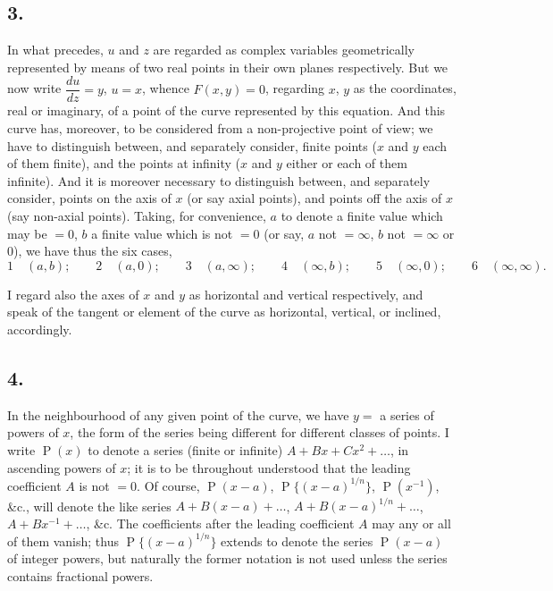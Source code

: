 \documentclass[11pt,a4paper]{article}
\theoremstyle{definition}
\DeclareMathOperator{\Pf}{P}
\begin{document}
\subsection*{3.}

In what precedes, $u$ and $z$ are regarded as complex variables geometrically represented by means of two real points in their own planes respectively. But we now write $\dfrac{du}{dz} = y$, $u = x$, whence $F(x, y) = 0$, regarding $x$, $y$ as the coordinates, real or imaginary, of a point of the curve represented by this equation. And this curve has, moreover, to be considered from a non-projective point of view; we have to distinguish between, and separately consider, finite points ($x$ and $y$ each of them finite), and the points at infinity ($x$ and $y$ either or each of them infinite). And it is moreover necessary to distinguish between, and separately consider, points on the axis of $x$ (or say axial points), and points off the axis of $x$ (say non-axial points). Taking, for convenience, $a$ to denote a finite value which may be $= 0$, $b$ a finite value which is not $= 0$ (or say, $a$ not $= \infty$, $b$ not $= \infty$ or $0$), we have thus the six cases,
\[
1\quad (a, b); \qquad 2\quad (a, 0); \qquad 3\quad (a, \infty); \qquad 4\quad (\infty, b); \qquad 5\quad (\infty, 0); \qquad 6\quad (\infty, \infty).
\]

I regard also the axes of $x$ and $y$ as horizontal and vertical respectively, and speak of the tangent or element of the curve as horizontal, vertical, or inclined, accordingly.

\subsection*{4.}

In the neighbourhood of any given point of the curve, we have $y =$ a series of powers of $x$, the form of the series being different for different classes of points. I write $\Pf(x)$ to denote a series (finite or infinite) $A + Bx + Cx^2 + \ldots$, in ascending powers of $x$; it is to be throughout understood that the leading coefficient $A$ is not $= 0$. Of course, $\Pf(x-a)$, $\Pf\{(x-a)^{1/n}\}$, $\Pf(x^{-1})$, \&c., will denote the like series $A + B(x - a) + \ldots$, $A + B(x - a)^{1/n} + \ldots$, $A + Bx^{-1} + \ldots$, \&c. The coefficients after the leading coefficient $A$ may any or all of them vanish; thus $\Pf\{(x - a)^{1/n}\}$ extends to denote the series $\Pf(x - a)$ of integer powers, but naturally the former notation is not used unless the series contains fractional powers.
\end{document}
